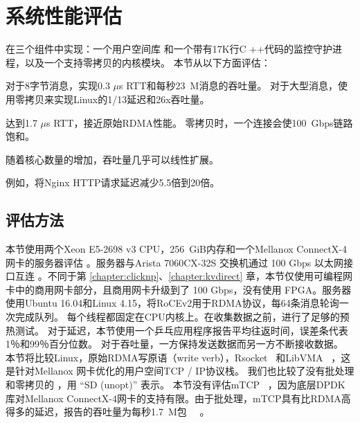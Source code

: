 \section{系统性能评估}
\label{socksdirect:sec:evaluation}



\sys{} 在三个组件中实现：一个用户空间库 \libipc {} 和一个带有17K行C ++代码的监控守护进程，以及一个支持零拷贝的内核模块。
本节从以下方面评估\sys{}：

对于8字节消息，\sys 实现0.3 $\mu$s RTT和每秒23~M消息的吞吐量。 对于大型消息，\sys 使用零拷贝来实现Linux的1/13延迟和26x吞吐量。

\sys 达到1.7 $\mu$s RTT，接近原始RDMA性能。
零拷贝时，一个连接会使100~Gbps链路饱和。



随着核心数量的增加，吞吐量几乎可以线性扩展。


例如，\sys  {}将Nginx HTTP请求延迟减少5.5倍到20倍。


\subsection{评估方法}
\label{socksdirect:subsec:methodology}

本节使用两个Xeon E5-2698 v3 CPU，256~GiB内存和一个Mellanox ConnectX-4网卡的服务器评估 \sys{}。服务器与Arista 7060CX-32S 交换机通过 100 Gbps 以太网接口互连 \cite {arista-7060cx}。不同于第 \ref{chapter:clicknp}、\ref{chapter:kvdirect} 章，本节仅使用可编程网卡中的商用网卡部分，且商用网卡升级到了 100 Gbps，没有使用 FPGA。服务器使用Ubuntu 16.04和Linux 4.15，将RoCEv2用于RDMA协议，每64条消息轮询一次完成队列。
每个线程都固定在CPU内核上。在收集数据之前，进行了足够的预热测试。
对于延迟，本节使用一个乒乓应用程序报告平均往返时间，误差条代表1％和99％百分位数。
对于吞吐量，一方保持发送数据而另一方不断接收数据。
本节将比较Linux，原始RDMA写原语（write verb），Rsocket~ \cite {rsockets}和LibVMA~ \cite {libvma}，这是针对Mellanox 网卡优化的用户空间TCP / IP协议栈。
我们也比较了没有批处理和零拷贝的 \sys{}，用 ``SD (unopt)'' 表示。
本节没有评估mTCP~ \cite {jeong2014mtcp}，因为底层DPDK库对Mellanox ConnectX-4网卡的支持有限。由于批处理，mTCP具有比RDMA高得多的延迟，报告的吞吐量为每秒1.7~M包~~ \cite {kalia2018datacenter}。

